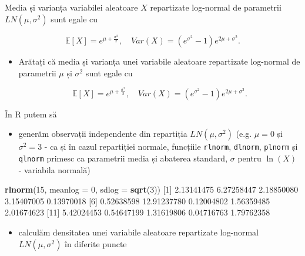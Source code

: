 \documentclass[]{article}
\newenvironment{Shaded}{\begin{snugshade}}{\end{snugshade}}
\newcommand{\KeywordTok}[1]{\textcolor[rgb]{0.13,0.29,0.53}{\textbf{#1}}}
\newcommand{\DataTypeTok}[1]{\textcolor[rgb]{0.13,0.29,0.53}{#1}}
\newcommand{\DecValTok}[1]{\textcolor[rgb]{0.00,0.00,0.81}{#1}}
\newcommand{\FloatTok}[1]{\textcolor[rgb]{0.00,0.00,0.81}{#1}}
\newcommand{\NormalTok}[1]{#1}
\providecommand{\tightlist}{%
  \setlength{\itemsep}{0pt}\setlength{\parskip}{0pt}}
\newenvironment{frshaded*}{%
  \def\FrameCommand{\fboxrule=\FrameRule\fboxsep=\FrameSep \fcolorbox{framecolor}{shadecolor1}}%
  \MakeFramed {\advance\hsize-\width \FrameRestore}}%
{\endMakeFramed}
\newenvironment{rmdblock}[1]
  {\begin{frshaded*}
  \begin{itemize}
  \renewcommand{\labelitemi}{
    \raisebox{-.7\height}[0pt][0pt]{
      {\setkeys{Gin}{width=2em,keepaspectratio}\texttt{[image: images/icons/\#1]}}
    }
  }
  \item
  }
  {
  \end{itemize}
  \end{frshaded*}
  }
\newenvironment{rmdexercise}
  {\begin{rmdblock}{exercise}}
  {\end{rmdblock}}
\begin{document}
Media și varianța variabilei aleatoare \(X\) repartizate log-normal de
parametrii \(LN(\mu, \sigma^2)\) sunt egale cu

\[
  \mathbb{E}[X] = e^{\mu+\frac{\sigma^2}{2}},\quad Var(X) = \left(e^{\sigma^2}-1\right)e^{2\mu+\sigma^2}. 
\]

\begin{rmdexercise}
Arătați că media și varianța unei variabile aleatoare repartizate
log-normal de parametrii \(\mu\) și \(\sigma^2\) sunt egale cu

\[
  \mathbb{E}[X] = e^{\mu+\frac{\sigma^2}{2}},\quad Var(X) = \left(e^{\sigma^2}-1\right)e^{2\mu+\sigma^2}. 
\]
\end{rmdexercise}

În R putem să

\begin{itemize}
\tightlist
\item
  generăm observații independente din repartiția \(LN(\mu, \sigma^2)\)
  (e.g. \(\mu = 0\) și \(\sigma^2 = 3\) - ca și în cazul repartiției
  normale, funcțiile \texttt{rlnorm}, \texttt{dlnorm}, \texttt{plnorm}
  și \texttt{qlnorm} primesc ca parametrii media și abaterea standard,
  \(\sigma\) pentru \(\ln(X)\) - variabila normală)
\end{itemize}

\begin{Shaded}
\begin{Highlighting}[]
\KeywordTok{rlnorm}\NormalTok{(}\DecValTok{15}\NormalTok{, }\DataTypeTok{meanlog =} \DecValTok{0}\NormalTok{, }\DataTypeTok{sdlog =} \KeywordTok{sqrt}\NormalTok{(}\DecValTok{3}\NormalTok{))}
\NormalTok{ [}\DecValTok{1}\NormalTok{]  }\FloatTok{2.13141475}  \FloatTok{6.27258447}  \FloatTok{2.18850080}  \FloatTok{3.15407005}  \FloatTok{0.13970018}
\NormalTok{ [}\DecValTok{6}\NormalTok{]  }\FloatTok{0.52638598} \FloatTok{12.91237780}  \FloatTok{0.12004802}  \FloatTok{1.56359485}  \FloatTok{2.01674623}
\NormalTok{[}\DecValTok{11}\NormalTok{]  }\FloatTok{5.42024453}  \FloatTok{0.54647199}  \FloatTok{1.31619806}  \FloatTok{0.04716763}  \FloatTok{1.79762358}
\end{Highlighting}
\end{Shaded}

\begin{itemize}
\tightlist
\item
  calculăm densitatea unei variabile aleatoare repartizate log-normal
  \(LN(\mu, \sigma^2)\) în diferite puncte
\end{itemize}
\end{document}
